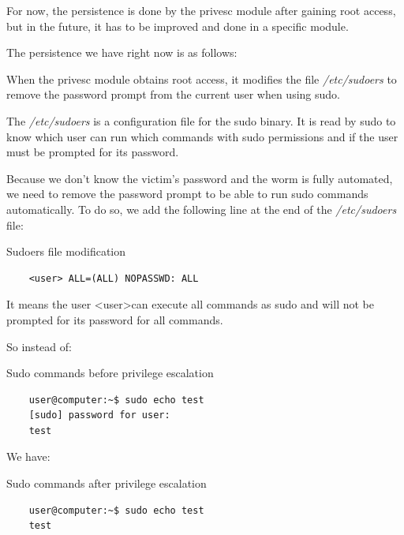 For now, the persistence is done by the privesc module after gaining root access, but in the future, it has to be improved and done in a specific module.

The persistence we have right now is as follows:

When the privesc module obtains root access, it modifies the file \textit{/etc/sudoers} to remove the password prompt from the current user when using sudo.

The \textit{/etc/sudoers} is a configuration file for the sudo binary. It is read by sudo to know which user can run which commands with sudo permissions and if the user must be prompted for its password.

Because we don't know the victim's password and the worm is fully automated, we need to remove the password prompt to be able to run sudo commands automatically. To do so, we add the following line at the end of the \textit{/etc/sudoers} file:

\begin{codesnippet}[H]
    \caption{Sudoers file modification}
    \label{code:sudoers_file_modification}
\end{codesnippet}
\vspace{-0.75cm}
\begin{lstlisting}
    <user> ALL=(ALL) NOPASSWD: ALL
\end{lstlisting}

It means the user \textless user\textgreater can execute all commands as sudo and will not be prompted for its password for all commands.

So instead of:

\begin{codesnippet}[H]
    \caption{Sudo commands before privilege escalation}
    \label{code:sudo_commands_before_privilege_escalation}
\end{codesnippet}
\vspace{-0.75cm}
\begin{lstlisting}
    user@computer:~$ sudo echo test
    [sudo] password for user:
    test
\end{lstlisting}

We have:

\begin{codesnippet}[H]
    \caption{Sudo commands after privilege escalation}
    \label{code:sudo_commands_after_privilege_escalation}
\end{codesnippet}
\vspace{-0.75cm}
\begin{lstlisting}
    user@computer:~$ sudo echo test
    test
\end{lstlisting}

